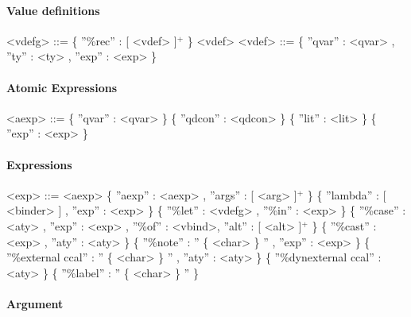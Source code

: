 \begin{scriptsize}
\begin{grammar}
\end{grammar}

\paragraph{Value definitions}

\begin{grammar}

<vdefg>		  ::= 	\{ ''\%rec'' : [ <vdef> ]$^{+}$ \}    							
<vdef> 		  ::= 	\{ ''qvar'' : <qvar> , ''ty'' : <ty> , ''exp'' : <exp> \}

\end{grammar}

\paragraph{Atomic Expressions}
\begin{grammar}


<aexp>		  ::= 	 \{ ''qvar'' : <qvar> \}
		  \alt 	 \{ ''qdcon'' : <qdcon> \}
		  \alt 	 \{ ''lit'' : <lit> \}
		  \alt 	 \{ ''exp'' : <exp> \} 


\end{grammar}

\paragraph{Expressions}

\begin{grammar}

<exp>		  ::= 	 <aexp>
		  \alt 	 \{ ''aexp'' : <aexp> , ''args'' : [ <arg> ]$^{+}$ \} 				
		  \alt 	 \{ ''lambda'' : [ <binder> ] , ''exp'' : <exp> \}		
		  \alt 	 \{ ''\%let'' : <vdefg> , ''\%in'' : <exp> \}				
		  \alt 	 \{ ''\%case'' : <aty> , ''exp'' : <exp> , ''\%of'' : <vbind>, ''alt'' : [ <alt> ]$^{+}$ \}	
		  \alt 	 \{ ''\%cast'' : <exp> , ''aty'' : <aty>	\}		
		  \alt 	 \{ ''\%note'' : ''  \{ <char> \} '' , ''exp'' : <exp>	\}	
		  \alt 	 \{ ''\%external ccal'' : '' \{ <char> \} '' , ''aty'' : <aty> \}	
		  \alt 	 \{ ''\%dynexternal ccal'' : <aty> \}
		  \alt 	 \{ ''\%label'' : '' \{ <char> \} '' \}


\end{grammar}

\paragraph{Argument}

\begin{grammar}


\end{grammar}
\end{scriptsize}
